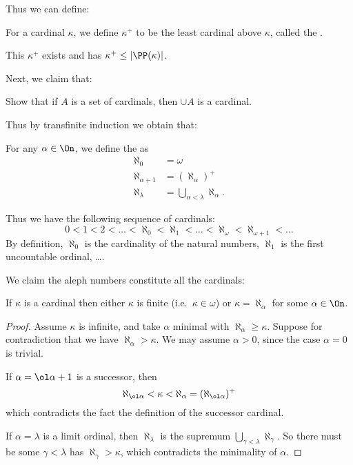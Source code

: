Thus we can define:
\begin{definition}
	For a cardinal $\kappa$, we define $\kappa^+$ to be the least cardinal above $\kappa$,
	called the .
\end{definition}
This $\kappa^+$ exists and has $\kappa^+ \le \left\lvert \PP(\kappa) \right\rvert$.

Next, we claim that:
\begin{exercise}
	Show that if $A$ is a set of cardinals, then $\cup A$ is a cardinal.
\end{exercise}

Thus by transfinite induction we obtain that:
\begin{definition}
	For any $\alpha \in \On$, we define the  as
	\begin{align*}
		\aleph_0 &= \omega \\
		\aleph_{\alpha+1} &= \left( \aleph_\alpha \right)^+ \\
		\aleph_{\lambda} &= \bigcup_{\alpha < \lambda} \aleph_\alpha.
	\end{align*}
\end{definition}

Thus we have the following sequence of cardinals:
\[
	0 < 1 < 2 < \dots < \aleph_0 < \aleph_1 < \dots < \aleph_\omega < \aleph_{\omega+1} < \dots
\]
By definition, $\aleph_0$ is the cardinality of the natural numbers,
$\aleph_1$ is the first uncountable ordinal, \dots.

We claim the aleph numbers constitute all the cardinals:
\begin{lemma}
	If $\kappa$ is a cardinal then
	either $\kappa$ is finite (i.e.\ $\kappa \in \omega$) or
	$\kappa = \aleph_\alpha$ for some $\alpha \in \On$.
\end{lemma}
\begin{proof}
	Assume $\kappa$ is infinite, and take $\alpha$ minimal with $\aleph_\alpha \ge \kappa$.
	Suppose for contradiction that we have $\aleph_\alpha > \kappa$.
	We may assume $\alpha > 0$, since the case $\alpha = 0$ is trivial.

	If $\alpha = \ol\alpha + 1$ is a successor, then
	\[ \aleph_{\ol\alpha} < \kappa < \aleph_{\alpha}
		= (\aleph_{\ol\alpha})^+ \]
	which contradicts the fact the definition of the successor cardinal.
	
	If $\alpha = \lambda$ is a limit ordinal, then $\aleph_\lambda$ is the
	supremum $\bigcup_{\gamma < \lambda} \aleph_\gamma$.
	So there must be some $\gamma < \lambda$ has $\aleph_\gamma > \kappa$,
	which contradicts the minimality of $\alpha$.
\end{proof}

